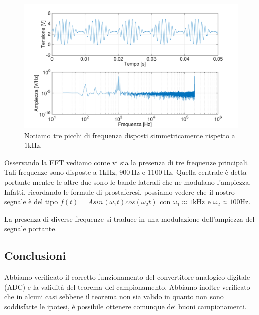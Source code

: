 \begin{figure}[H]
\centering
	\includegraphics[width=.63\textwidth]{../E13/latex/am1000hz@10000,200000.pdf}
	\caption{Notiamo tre picchi di frequenza disposti simmetricamente rispetto a $1\si{\kilo\hertz}$.}
	\label{am}
\end{figure}

Osservando la FFT vediamo come vi sia la presenza di tre frequenze principali. Tali frequenze sono disposte a $1\si{\kilo\hertz}$, $\SI{900}{\hertz}$ e $\SI{1100}{\hertz}$. Quella centrale è detta portante mentre le altre due sono le bande laterali che ne modulano l'ampiezza.  Infatti, ricordando le formule di prostaferesi, possiamo vedere che il nostro segnale è del tipo $f(t)=Asin(\omega_1 t)cos(\omega_2 t)$ con $\omega_1 \approx 1 \si{\kilo\hertz}$ e $\omega_2 \approx 100 \si{\hertz}$. 

La presenza di diverse frequenze si traduce in una modulazione dell'ampiezza del segnale portante.

\subsection*{Conclusioni}

Abbiamo verificato il corretto funzionamento del convertitore analogico-digitale (ADC) e la validità del teorema del campionamento. Abbiamo inoltre verificato che in alcuni casi sebbene il teorema non sia valido in quanto non sono soddisfatte le ipotesi, è possibile ottenere comunque dei buoni campionamenti.
